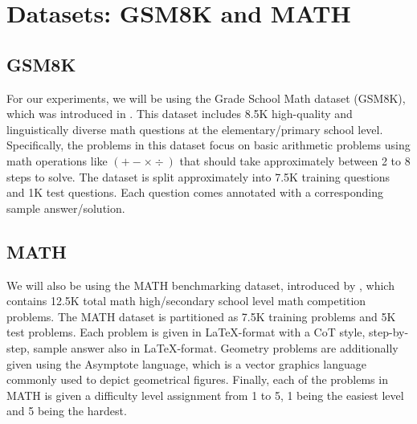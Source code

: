 
\section{Datasets: GSM8K and MATH}

\subsection{GSM8K}

For our experiments, we will be using the Grade School Math dataset (GSM8K), which was introduced in \citet{cobbe2021trainingverifierssolvemath}. This dataset includes 8.5K high-quality and linguistically diverse math questions at the elementary/primary school level. Specifically, the problems in this dataset focus on basic arithmetic problems using math operations like $(+-\times\div)$ that should take approximately between 2 to 8 steps to solve. The dataset is split approximately into 7.5K training questions and 1K test questions. Each question comes annotated with a corresponding sample answer/solution.

\subsection{MATH}

We will also be using the MATH benchmarking dataset, introduced by \citet{hendrycks2021measuringmathematicalproblemsolving}, which contains 12.5K total math high/secondary school level math competition problems. The MATH dataset is partitioned as 7.5K training problems and 5K test problems. Each problem is given in \LaTeX-format with a CoT style, step-by-step, sample answer also in \LaTeX-format. Geometry problems are additionally given using the Asymptote language, which is a vector graphics language commonly used to depict geometrical figures. Finally, each of the problems in MATH is given a difficulty level assignment from 1 to 5, 1 being the easiest level and 5 being the hardest.

